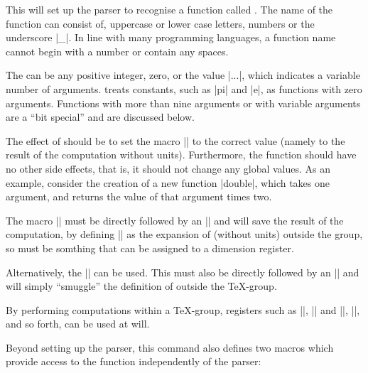\begin{command}{\pgfmathdeclarefunction{}}

  This will set up the parser to recognise a function called 
  . The name of the function can consist of, uppercase or
  lower case letters, numbers or the underscore |_|. In line with 
  many programming languages, a function name cannot begin with a 
  number or contain any spaces.
  
  The  can be any positive integer, zero,
  or the value |...|, which indicates a variable number of 
  arguments. \pgfname{} treats constants, such as |pi| and |e|, as
  functions with zero arguments. Functions with more than nine
  arguments or with variable arguments are a ``bit special'' and
  are discussed below.
  
  The effect of  should be to set the macro 
  |\pgfmathresult| to the correct value (namely to the result of the 
  computation without units).  Furthermore, the function should have 
  no other side effects, that is, it should not change any global 
  values. As an example, consider the creation of a new function
  |double|, which takes one argument, and returns the value of that
  argument times two.
  
\begin{codeexample}[]
\makeatletter
{}
\makeatother
{}\pgfmathresult
\end{codeexample}

  The macro |\pgfmathreturn| must be 
  directly followed by an |\endgroup| and will save the result of the 
  computation, by defining |\pgfmathresult| as the expansion of 
   (without units) outside the group, so 
  must be somthing that can be assigned to a dimension register.
  
  Alternatively, the |\pgfmathsmuggle| can be used. This
  must also be directly followed by an |\endgroup| and will simply
  ``smuggle'' the definition of  outside the \TeX-group.
  
	By performing computations within a \TeX-group, \pgfname{}
	registers such as |\pgf@x|, |\pgf@y| and |\c@pgf@counta|, 
	|\c@pgfcountb|, and so forth, can be used at will.
  
  Beyond setting up the parser, this command also defines two macros
  which provide access to the function independently of the parser:  
    

\end{command}
